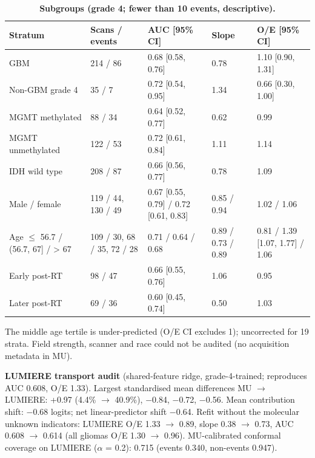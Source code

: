 \documentclass[11pt,a4paper]{article}
\begin{document}
\begin{table}[H]
\centering
\small
\renewcommand{\thetable}{S23}\renewcommand{\theHtable}{S23}
\caption{\textbf{Subgroups (grade 4; \textdagger{} fewer than 10 events, descriptive).}}
\label{tab:S23}
\begin{tabularx}{\linewidth}{@{}R{3.3cm} R{2.6cm} L R{2.0cm} R{2.7cm}@{}}
\toprule
Stratum & Scans / events & AUC [95\% CI] & Slope & O/E [95\% CI] \\
\midrule
GBM & 214 / 86 & 0.68 [0.58, 0.76] & 0.78 & 1.10 [0.90, 1.31] \\
Non-GBM grade 4 \textdagger{} & 35 / 7 & 0.72 [0.54, 0.95] & 1.34 & 0.66 [0.30, 1.00] \\
MGMT methylated & 88 / 34 & 0.64 [0.52, 0.77] & 0.62 & 0.99 \\
MGMT unmethylated & 122 / 53 & 0.72 [0.61, 0.84] & 1.11 & 1.14 \\
IDH wild type & 208 / 87 & 0.66 [0.56, 0.77] & 0.78 & 1.09 \\
Male / female & 119 / 44, 130 / 49 & 0.67 [0.55, 0.79] / 0.72 [0.61, 0.83] & 0.85 / 0.94 & 1.02 / 1.06 \\
Age $\leq$ 56.7 / (56.7, 67] / > 67 & 109 / 30, 68 / 35, 72 / 28 & 0.71 / 0.64 / 0.68 & 0.89 / 0.73 / 0.89 & 0.81 / 1.39 [1.07, 1.77] / 1.06 \\
Early post-RT & 98 / 47 & 0.66 [0.55, 0.76] & 1.06 & 0.95 \\
Later post-RT & 69 / 36 & 0.60 [0.45, 0.74] & 0.50 & 1.03 \\
\bottomrule
\end{tabularx}
\end{table}

The middle age tertile is under-predicted (O/E CI excludes 1); uncorrected for 19 strata. Field strength,
scanner and race could not be audited (no acquisition metadata in MU).

\textbf{LUMIERE transport audit} (shared-feature ridge, grade-4-trained; reproduces AUC 0.608, O/E 1.33).
Largest standardised mean differences MU $\rightarrow$ LUMIERE:  +0.97 (4.4\%
$\rightarrow$
40.9\%),  $-$0.84, 
$-$0.72,  $-$0.56. Mean
contribution shift:  $-$0.68 logits; net linear-predictor shift $-$0.64. Refit
without the
molecular unknown indicators: LUMIERE O/E 1.33 $\rightarrow$ 0.89, slope 0.38 $\rightarrow$ 0.73, AUC 0.608
$\rightarrow$ 0.614 (all gliomas O/E 1.30 $\rightarrow$ 0.96). MU-calibrated conformal coverage on LUMIERE
($\alpha$ = 0.2): 0.715 (events 0.340, non-events 0.947).
\end{document}
